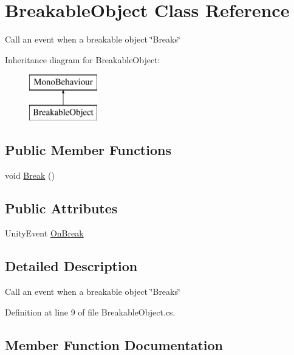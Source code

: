 \hypertarget{class_breakable_object}{}\section{Breakable\+Object Class Reference}
\label{class_breakable_object}


Call an event when a breakable object \char`\"{}\+Breaks\char`\"{}  


Inheritance diagram for Breakable\+Object\+:\begin{figure}[H]
\begin{center}
\leavevmode
\includegraphics[height=2.000000cm]{class_breakable_object}
\end{center}
\end{figure}
\subsection*{Public Member Functions}
\begin{DoxyCompactItemize}
\item 
void \mbox{\hyperlink{class_breakable_object_a5a887edae7fbf00448015c8980c4f184}{Break}} ()
\end{DoxyCompactItemize}
\subsection*{Public Attributes}
\begin{DoxyCompactItemize}
\item 
Unity\+Event \mbox{\hyperlink{class_breakable_object_ab52a2c2d2d6438f97053da6c69d019e0}{On\+Break}}
\end{DoxyCompactItemize}


\subsection{Detailed Description}
Call an event when a breakable object \char`\"{}\+Breaks\char`\"{} 



Definition at line 9 of file Breakable\+Object.\+cs.



\subsection{Member Function Documentation}
\mbox{\label{class_breakable_object_a5a887edae7fbf00448015c8980c4f184}} 
